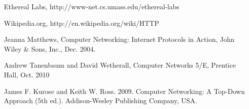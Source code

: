 \begin{thebibliography}{99}

Ethereal Labs,
  http://www-net.cs.umass.edu/ethereal-labs

Wikipedia.org,
  http://en.wikipedia.org/wiki/HTTP

 Jeanna Matthews, Computer Networking: Internet Protocols in Action,
  John Wiley \& Sons, Inc., Dec. 2004.
  
  Andrew Tanenbaum and David Wetherall,  Computer Networks 5/E, Prentice Hall, Oct. 2010

 James F. Kurose and Keith W. Ross. 2009. Computer Networking: A Top-Down Approach (5th ed.). Addison-Wesley Publishing Company,  USA.


\end{thebibliography}